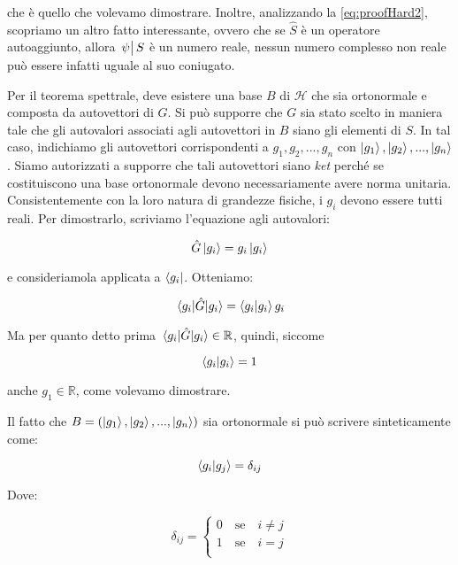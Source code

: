 che è quello che volevamo dimostrare. Inoltre, analizzando la \eqref{eq:proofHard2}, scopriamo un altro fatto interessante, ovvero che se $\hat{S}$ è un operatore autoaggiunto, allora $\eval{\psi}{S}$ è un numero reale, nessun numero complesso non reale può essere infatti uguale al suo coniugato.

Per il teorema spettrale, deve esistere una base $B$ di $\mathcal{H}$ che sia ortonormale e composta da autovettori di $G$. Si può supporre che $G$ sia stato scelto in maniera tale che gli autovalori associati agli autovettori in $B$ siano gli elementi di $S$.
In tal caso, indichiamo gli autovettori corrispondenti a $g_1, g_2, ..., g_n$ con $\ket{g_1}, \ket{g_2}, ..., \ket{g_n}$. Siamo autorizzati a supporre che tali autovettori siano \textit{ket} perché se costituiscono una base ortonormale devono necessariamente avere norma unitaria. \\
Consistentemente con la loro natura di grandezze fisiche, i $g_i$ devono essere tutti reali. Per dimostrarlo, scriviamo l'equazione agli autovalori:

    \begin{equation} \label{eq:realEigenvaluesProof0}
        \hat{G} \ket{g_i} = g_i \ket{g_i}
    \end{equation}
    
e consideriamola applicata a $\bra{g_i}$. Otteniamo:

    \begin{equation}
        \mel{g_i}{\hat{G}}{g_i} = \braket{g_i}{g_i}g_i
    \end{equation}
    
Ma per quanto detto prima $\mel{g_i}{\hat{G}}{g_i} \in \mathbb{R}$, quindi, siccome

    \[
        \braket{g_i}{g_i} = 1
    \]
    
anche $g_1 \in \mathbb{R}$, come volevamo dimostrare.
    
Il fatto che $B = ( \ket{g_1}, \ket{g_2}, ..., \ket{g_n} ) $ sia ortonormale si può scrivere sinteticamente come: 

	\begin{equation} \label{eq:orthonormalBasis}
		\braket{g_i}{g_j} = \delta_{ij}
	\end{equation}

Dove:

 	\begin{equation}
		\delta_{ij} = \left \{ \begin{array}{l}
				0 \quad \text{se} \quad i \neq j \\
				1 \quad \text{se} \quad i = j \\
			\end{array}
		\right.
	\end{equation}


